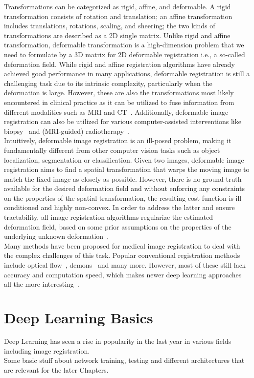 \documentclass[english,version-2022-01]{uzl-thesis} %
\begin{document}
Transformations can be categorized as rigid, affine, and deformable. A rigid transformation consists of rotation and translation; an affine transformation
includes translations, rotations, scaling, and sheering; the two kinds of transformations are described as a 2D single matrix. Unlike rigid and affine transformation, deformable transformation is a high-dimension problem that we need to formulate by a 3D matrix for 2D deformable registration i.e., a so-called deformation field. While rigid and affine registration algorithms have already achieved good performance in many applications, deformable registration is still a challenging task due to its intrinsic complexity, particularly when the deformation is large. However, these are also the transformations most likely encountered in clinical practice as it can be utilized to fuse information from different modalities such as MRI and CT~\cite{Zou2022}. Additionally, deformable image registration can also be
utilized for various computer-assisted interventions like biopsy~\cite{Tam2016} and (MRI-guided) radiotherapy~\cite{Chen2017, Rigaud2019}. \\
Intuitively, deformable image registration is an ill-posed problem, making it fundamentally different from other computer vision tasks such as object localization, segmentation or classification. Given two images, deformable image registration aims to find a spatial transformation that warps the moving image to match the fixed image as closely as possible. However, there is no ground-truth available for the desired deformation field and without enforcing any constraints on the properties of the spatial transformation, the resulting cost function is ill-conditioned and highly non-convex. In order to address the latter and ensure tractability, all image registration algorithms regularize the estimated deformation field, based on some prior assumptions on the properties of the underlying unknown deformation~\cite{Chen2020}.\\
Many methods have been proposed for medical image registration to deal with the complex challenges of this task. Popular conventional registration methods include optical flow~\cite{Yang2008}, demons~\cite{Vercauteren2009} and many more. However, most of these still lack accuracy and computation speed, which makes newer deep learning approaches all the more interesting~\cite{Fu2020}.

\section{Deep Learning Basics}
Deep Learning has seen a rise in popularity in the last year in various fields including image registration. \\
Some basic stuff about network training, testing and different architectures that are relevant for the later Chapters.
\end{document}
